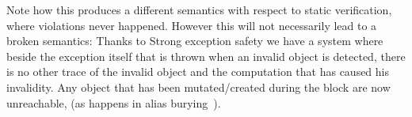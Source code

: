 \begin{itemize}
Note how this produces a different semantics with respect to static verification, where violations
never happened. However this will not necessarily lead to a broken semantics:
Thanks to Strong exception safety we have a system where beside the exception itself that is thrown when an invalid object is detected,
there is no other trace of the invalid object and the computation that has caused his invalidity.
Any object that has been mutated/created during the \Q@try@ block are now unreachable,
(as happens in alias burying~\cite{boyland2001alias}).
\end{itemize}









